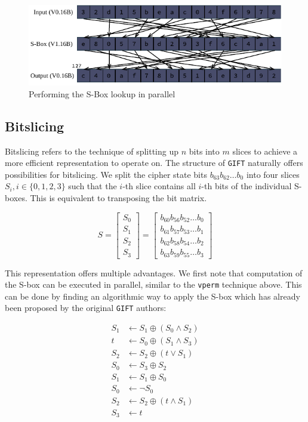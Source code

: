 \documentclass[12pt]{report}
\begin{document}
\begin{figure}[h!]
    \centering
    \includegraphics[width=\textwidth]{Figures/tbl_example.pdf}
    \caption{Performing the S-Box lookup in parallel}
\end{figure}

\subsection{Bitslicing}

Bitslicing refers to the technique of splitting up $n$ bits into $m$ slices to
achieve a more efficient representation to operate on. The structure of
\texttt{GIFT} naturally offers possibilities for bitslicing. We split the
cipher state bits $b_{63}b_{62}\dots b_0$ into four slices $S_i,
i\in\{0,1,2,3\}$ such that the $i$-th slice contains all $i$-th bits of the
individual S-boxes. This is equivalent to transposing the bit matrix.

\[
    S=\begin{bmatrix}
        S_0\\
        S_1\\
        S_2\\
        S_3
    \end{bmatrix}
    =\begin{bmatrix}
        b_{60}b_{56}b_{52}\dots b_0\\
        b_{61}b_{57}b_{53}\dots b_1\\
        b_{62}b_{58}b_{54}\dots b_2\\
        b_{63}b_{59}b_{55}\dots b_3
    \end{bmatrix}
\]

This representation offers multiple advantages. We first note that computation
of the S-box can be executed in parallel, similar to the \texttt{vperm}
technique above. This can be done by finding an algorithmic way to apply the
S-box which has already been proposed by the original \texttt{GIFT} authors:

\begin{align*}
    S_1&\leftarrow S_1\oplus (S_0\land S_2) \\
    t&\leftarrow S_0\oplus (S_1\land S_3) \\
    S_2&\leftarrow S_2\oplus (t\lor S_1) \\
    S_0&\leftarrow S_3\oplus S_2 \\
    S_1&\leftarrow S_1\oplus S_0 \\
    S_0&\leftarrow \lnot S_0 \\
    S_2&\leftarrow S_2\oplus (t\land S_1) \\
    S_3&\leftarrow t
\end{align*}
\end{document}
